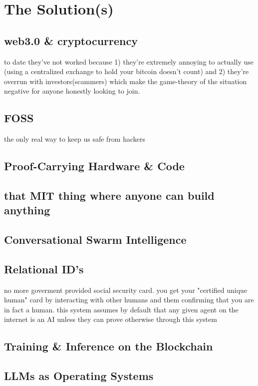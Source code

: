 \documentclass{article}
\begin{document}
\section{The Solution(s)}

\subsection{web3.0 \& cryptocurrency}
to date they've not worked because 1) they're extremely annoying to actually use (using a centralized exchange to hold your bitcoin doesn't count) and 2) they're overrun with investors(scammers) which make the game-theory of the situation negative for anyone honestly looking to join. 

\subsection{FOSS}
the only real way to keep us safe from hackers

\subsection{Proof-Carrying Hardware \& Code}

\subsection{that MIT thing where anyone can build anything}

\subsection{Conversational Swarm Intelligence}

\subsection{Relational ID's}
no more goverment provided social security card. you get your "certified unique human" card by interacting with other humans and them confirming that you are in fact a human. this system assumes by default that any given agent on the internet is an AI unless they can prove otherwise through this system

\subsection{Training \& Inference on the Blockchain}

\subsection{LLMs as Operating Systems}
\end{document}
